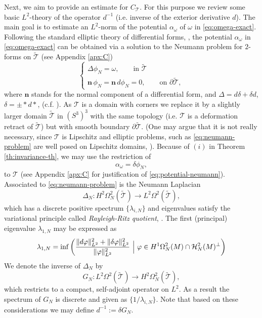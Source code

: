 \documentclass[12pt]{article}
\numberwithin{equation}{section}
\newcommand{\no}{\noindent}
\begin{document}
Next, we aim to provide an estimate for $C_\mathcal{T}$. For this purpose we review 
some basic $L^2$-theory of the operator $d^{-1}$ (i.e. inverse of the exterior derivative $d$).
The main goal is to estimate an $L^2$-norm of the potential $\alpha_\omega$ of $\omega$ in \eqref{eq:omega-exact}. Following the standard elliptic theory of differential forms, \cite{Schwarz95}, the potential $\alpha_\omega$ in \eqref{eq:omega-exact} can be obtained via a solution to the Neumann problem for $2$-forms on $\widetilde{\mathcal{T}}$ (see Appendix \ref{apx:C})
\begin{equation}\label{eq:neumann-problem}
 \begin{cases}
  \Delta \phi_N=\omega,\qquad \text{in } \widetilde{\mathcal{T}}\\
  \mathbf{n}\,\phi_N=\mathbf{n}\,d\phi_N=0,\qquad \text{on } \partial \widetilde{\mathcal{T}},
 \end{cases}
\end{equation}
where $\mathbf{n}$ stands for the normal component of a differential form, and $\Delta=d\delta+\delta d$, $\delta=\pm\ast d\ast$, (c.f. \cite{Schwarz95}).
As $\mathcal{T}$ is a domain with corners we replace it by a slightly larger domain $\widetilde{\mathcal{T}}$ in $(S^3)^3$ with the same topology 
(i.e. $\mathcal{T}$ is a deformation retract of $\widetilde{\mathcal{T}}$) but with smooth boundary $\partial\widetilde{\mathcal{T}}$. (One may argue that it is not really necessary, since $\mathcal{T}$ is 
Lipschitz and elliptic problems, such as \eqref{eq:neumann-problem} are well posed on Lipschitz domains, \cite{Mitrea-Mitrea-Taylor01}).
Because of  $(i)$ in Theorem \ref{th:invariance-th}, we may use the restriction of 
\begin{equation}\label{eq:potential-neumann}
\alpha_\omega=\delta\phi_N,
\end{equation}
 to $\mathcal{T}$ (see Appendix \ref{apx:C} for justification of \eqref{eq:potential-neumann}).
Associated to \eqref{eq:neumann-problem} is the Neumann Laplacian
\[
 \Delta_N:H^2\Omega^2_N(\widetilde{\mathcal{T}})\longrightarrow L^2\Omega^2(\widetilde{\mathcal{T}}),
\] 
which has a discrete positive spectrum $\{\lambda_{i,N}\}$ and eigenvalues satisfy the variational principle called \emph{Rayleigh-Ritz quotient}, \cite{Chavel84}. The first (principal) eigenvalue  $\lambda_{1,N}$ may be expressed as
\[
 \lambda_{1,N}=\inf\left( 	\frac{\|d\varphi\|^2_{L^2}+\|\delta\varphi\|^2_{L^2}}{\|\varphi\|^2_{L^2}}\ \Bigl|\ \varphi\in H^1\Omega^2_N(M)\cap \mathcal{H}^2_N(M)^\perp\right)
\]
\no We denote the inverse of $\Delta_N$ by
\[
 G_N:L^2\Omega^2(\widetilde{\mathcal{T}})\longrightarrow H^2\Omega^2_N(\widetilde{\mathcal{T}}),
\]
which restricts to a compact, self-adjoint operator on $L^2$. As a result the spectrum of $G_N$ is 
discrete and given as $\{1/\lambda_{i,N}\}$. Note that based on these considerations we may define $d^{-1}:=\delta G_N$.
\end{document}

